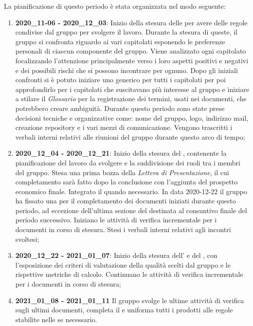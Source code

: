 La pianificazione di questo periodo è stata organizzata nel modo seguente:
\begin{enumerate}
\item \textbf{2020\_11-06 - 2020\_12\_03}:
Inizio della stesura delle \textit{\NdP} per avere delle regole condivise dal gruppo per svolgere il lavoro. Durante la stesura di queste, il gruppo si confronta riguardo ai vari capitolati esponendo le preferenze personali di ciascun componente del gruppo. Viene analizzato ogni capitolato focalizzando l'attenzione principalmente verso i loro aspetti positivi e negativi e dei possibili rischi che si possono incontrare per ognuno. Dopo gli iniziali confronti si è potuto iniziare uno \textit{\SdF} generico per tutti i capitolati per poi approfondirlo per i capitolati che suscitavano più interesse al gruppo e iniziare a stilare il \textit{Glossario} per la registrazione dei termini, usati nei documenti, che potrebbero creare ambiguità. Durante questo periodo sono state prese decisioni tecniche e organizzative come: nome del gruppo, logo, indirizzo mail, creazione repository e i vari mezzi di comunicazione. Vengono trascritti i verbali interni relativi alle riunioni del gruppo durante questo arco di tempo;
\item \textbf{2020\_12\_04 - 2020\_12\_21}:
Inizio della stesura del \textit{\PdP}, contenente la pianificazione del lavoro da svolgere e la suddivisione dei ruoli tra i membri del gruppo. Stesa una prima bozza della \textit{Lettera di Presentazione}, il cui completamento sarà fatto dopo la conclusione \textit{\PdP} con l'aggiunta del prospetto economico finale. Integrato il \textit{\Glossario} quando necessario. In data 2020-12-22 il gruppo ha fissato una  per il completamento dei documenti iniziati durante questo periodo, ad eccezione dell'ultima sezione del \textit{\PdP} destinata al consuntivo finale del periodo successivo. Iniziano le attività di verifica incrementale per i documenti in corso di stesura. Stesi i verbali interni relativi agli incontri svoltesi;
\item \textbf{2020\_12\_22 - 2021\_01\_07}:
Inizio della stesura dell'\textit{\AdR} e del \textit{\PdQ}, con l'esposizione dei criteri di valutazione della qualità scelti dal gruppo e le rispettive metriche di calcolo. Continuano le attività di verifica incrementale per i documenti in corso di stesura;
\item \textbf{2021\_01\_08 - 2021\_01\_11}
Il gruppo svolge le ultime attività di verifica sugli ultimi documenti, completa il \textit{\Glossario} e uniforma tutti i prodotti alle regole stabilite nelle \textit{\NdP} se necessario.
\end{enumerate}

